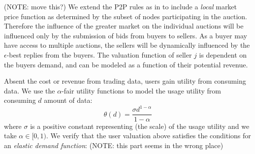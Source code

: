 \documentclass[12pt]{article}
\theoremstyle{definition}
\begin{document}
\begin{multicols}{2}
(NOTE: move this?)
We extend the P2P rules as in \cite{semret} to include a \emph{local} market
price function as determined by the subset of nodes participating in the
auction. Therefore the influence of the greater market on the individual
auctions will be influenced only by the submission of bids from buyers to
sellers. As a buyer may have access to multiple auctions, the sellers will be
dynamically influenced by the $\epsilon$-best replies from the buyers. The
valuation function of seller $j$ is dependent on the buyers demand, and can be
modeled as a function of their potential revenue. 

Absent the cost or revenue from trading data, users gain utility from consuming
data. We use the $\alpha$-fair utility functions \cite{tuffin} to model the
usage utility from consuming $d$ amount of data:
\begin{equation}
    \theta(d) = \frac{\sigma d^{1-\alpha}}{1-\alpha}
\end{equation}
where $\sigma$ is a positive constant representing (the scale) of the usage
utility and we take $\alpha \in [0, 1)$.
We verify that the user valuation above satisfies the conditions for an
\emph{elastic demand function}: (NOTE: this part seems in the wrong place)


\end{multicols}
\end{document}
